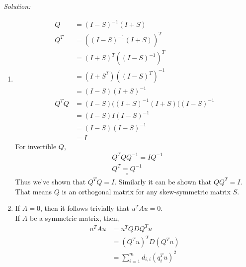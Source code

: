 \documentclass[fleqn]{article}
\newenvironment{solution}
    {\textit{Solution:}}
    {}
\begin{document}
\begin{solution}
    \begin{enumerate}[label=(\alph*)]
        \item 
        \begin{equation*}
            \begin{split}
               Q &= (I - S)^{-1}(I + S)\\
               Q^{T} &= ((I - S)^{-1}(I + S))^{T}\\
               &= (I + S)^{T}((I - S)^{-1})^{T}\\
               &= (I + S^{T})((I - S)^{T})^{-1}\\
               &= (I - S)(I + S)^{-1}\\
               Q^{T}Q &= (I - S)((I + S)^{-1}(I + S)((I - S)^{-1}\\
               &= (I - S)I(I - S)^{-1}\\
               &= (I - S)(I - S)^{-1}\\
               &= I
            \end{split}
        \end{equation*}
        For invertible $Q$,
        \begin{equation*}
            \begin{split}
                &Q^{T} Q Q^{-1} = I Q^{-1}\\
                &\underline{\underline{Q^{T} = Q^{-1}}}
            \end{split}
        \end{equation*}
        Thus we've shown that $Q^{T}Q  = I$. Similarly it can be shown that $QQ^{T} = I$. That means $Q$ is an orthogonal matrix for any skew-symmetric matrix $S$.

        \item
        If $A = 0$, then it follows trivially that $u^{T}Au = 0$.\\
        If $A$ be a symmetric matrix, then,
        \begin{equation*}
            \begin{split}
                u^{T}Au &= u^{T}QDQ^{T}u\\
                &= (Q^{T}u)^{T}D(Q^{T}u)\\
                &= \sum_{i=1}^{m}d_{i,i}(q_{i}^{T}u)^{2}\\
            \end{split}
        \end{equation*}


\end{enumerate}
\end{solution}
\end{document}
